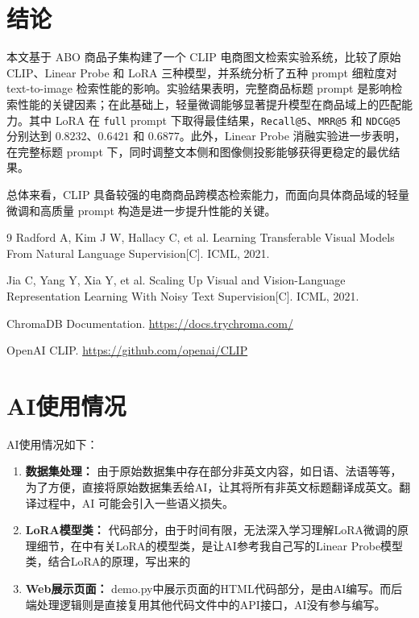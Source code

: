 \documentclass[11pt, a4paper]{ctexart}
\begin{document}
\section{结论}

本文基于 ABO 商品子集构建了一个 CLIP 电商图文检索实验系统，比较了原始 CLIP、Linear Probe 和 LoRA 三种模型，并系统分析了五种 prompt 细粒度对 text-to-image 检索性能的影响。实验结果表明，完整商品标题 prompt 是影响检索性能的关键因素；在此基础上，轻量微调能够显著提升模型在商品域上的匹配能力。其中 LoRA 在 \texttt{full} prompt 下取得最佳结果，\texttt{Recall@5}、\texttt{MRR@5} 和 \texttt{NDCG@5} 分别达到 $0.8232$、$0.6421$ 和 $0.6877$。此外，Linear Probe 消融实验进一步表明，在完整标题 prompt 下，同时调整文本侧和图像侧投影能够获得更稳定的最优结果。

总体来看，CLIP 具备较强的电商商品跨模态检索能力，而面向具体商品域的轻量微调和高质量 prompt 构造是进一步提升性能的关键。

\begin{thebibliography}{9}
Radford A, Kim J W, Hallacy C, et al. Learning Transferable Visual Models From Natural Language Supervision[C]. ICML, 2021.

Jia C, Yang Y, Xia Y, et al. Scaling Up Visual and Vision-Language Representation Learning With Noisy Text Supervision[C]. ICML, 2021.

ChromaDB Documentation. \url{https://docs.trychroma.com/}

OpenAI CLIP. \url{https://github.com/openai/CLIP}
\end{thebibliography}



\section{AI使用情况}
AI使用情况如下：
\begin{enumerate}[leftmargin=2em, itemsep=0pt]
    \item \textbf{数据集处理：} 由于原始数据集中存在部分非英文内容，如日语、法语等等，为了方便，直接将原始数据集丢给AI，让其将所有非英文标题翻译成英文。翻译过程中，AI 可能会引入一些语义损失。
    \item \textbf{LoRA模型类：} 代码部分，由于时间有限，无法深入学习理解LoRA微调的原理细节，在中有关LoRA的模型类，是让AI参考我自己写的Linear Probe模型类，结合LoRA的原理，写出来的
    \item \textbf{Web展示页面：} demo.py中展示页面的HTML代码部分，是由AI编写。而后端处理逻辑则是直接复用其他代码文件中的API接口，AI没有参与编写。
\end{enumerate}
\end{document}
